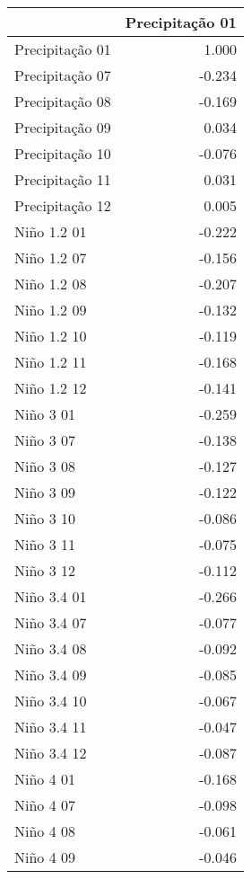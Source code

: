 \begin{tabular}{lr}
\toprule
{} &  Precipitação 01 \\
\midrule
Precipitação 01 &            1.000 \\
Precipitação 07 &           -0.234 \\
Precipitação 08 &           -0.169 \\
Precipitação 09 &            0.034 \\
Precipitação 10 &           -0.076 \\
Precipitação 11 &            0.031 \\
Precipitação 12 &            0.005 \\
Niño 1.2 01     &           -0.222 \\
Niño 1.2 07     &           -0.156 \\
Niño 1.2 08     &           -0.207 \\
Niño 1.2 09     &           -0.132 \\
Niño 1.2 10     &           -0.119 \\
Niño 1.2 11     &           -0.168 \\
Niño 1.2 12     &           -0.141 \\
Niño 3 01       &           -0.259 \\
Niño 3 07       &           -0.138 \\
Niño 3 08       &           -0.127 \\
Niño 3 09       &           -0.122 \\
Niño 3 10       &           -0.086 \\
Niño 3 11       &           -0.075 \\
Niño 3 12       &           -0.112 \\
Niño 3.4 01     &           -0.266 \\
Niño 3.4 07     &           -0.077 \\
Niño 3.4 08     &           -0.092 \\
Niño 3.4 09     &           -0.085 \\
Niño 3.4 10     &           -0.067 \\
Niño 3.4 11     &           -0.047 \\
Niño 3.4 12     &           -0.087 \\
Niño 4 01       &           -0.168 \\
Niño 4 07       &           -0.098 \\
Niño 4 08       &           -0.061 \\
Niño 4 09       &           -0.046 \\

\end{tabular}
